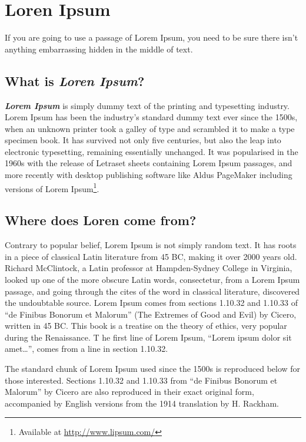 \chapter{Loren Ipsum} \label{ap1:loren}

If you are going to use a passage of Lorem Ipsum, you need to be sure
there isn't anything embarrassing hidden in the middle of text.

\section{What is \emph{Loren Ipsum}?}

\emph{\textbf{Lorem Ipsum}} is simply dummy text of the printing and
typesetting industry. Lorem Ipsum has been the industry's standard
dummy text ever since the 1500s, when an unknown printer took a galley
of type and scrambled it to make a type specimen book.
It has survived not only five centuries, but also the leap into
electronic typesetting, remaining essentially unchanged.
It was popularised in the 1960s with the release of Letraset sheets
containing Lorem Ipsum passages, and more recently with desktop
publishing software like Aldus PageMaker including versions of Lorem
Ipsum\footnote{Available at \url{http://www.lipsum.com/}}.

\section{Where does Loren come from?}

Contrary to popular belief, Lorem Ipsum is not simply random text.
It has roots in a piece of classical Latin literature from 45 BC,
making it over 2000 years old.
Richard McClintock, a Latin professor at Hampden-Sydney College in
Virginia, looked up one of the more obscure Latin words, consectetur,
from a Lorem Ipsum passage, and going through the cites of the word in
classical literature, discovered the undoubtable source.
Lorem Ipsum comes from sections 1.10.32 and 1.10.33 of ``de Finibus
Bonorum et Malorum'' (The Extremes of Good and Evil) by Cicero,
written in 45 BC.
This book is a treatise on the theory of ethics, very popular during
the Renaissance. T
he first line of Lorem Ipsum, ``Lorem ipsum dolor sit amet\ldots'',
comes from a line in section 1.10.32.

The standard chunk of Lorem Ipsum used since the 1500s is reproduced
below for those interested.
Sections 1.10.32 and 1.10.33 from ``de Finibus Bonorum et Malorum'' by
Cicero are also reproduced in their exact original form, accompanied
by English versions from the 1914 translation by H. Rackham.

